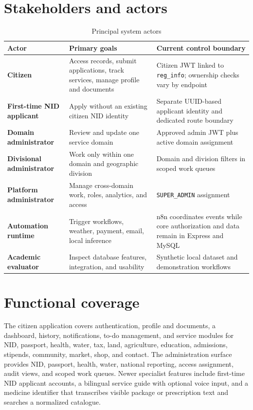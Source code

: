 \documentclass[12pt,a4paper,oneside]{report}
\newcommand{\code}[1]{\texttt{#1}}
\begin{document}
\section{Stakeholders and actors}

\begin{table}[htbp]
\centering
\caption{Principal system actors}
\begin{tabularx}{\textwidth}{>{\bfseries}p{} X X}
\toprule
Actor & Primary goals & Current control boundary\\
\midrule
Citizen & Access records, submit applications, track services, manage profile and documents & Citizen JWT linked to \code{reg\_info}; ownership checks vary by endpoint\\
First-time NID applicant & Apply without an existing citizen NID identity & Separate UUID-based applicant identity and dedicated route boundary\\
Domain administrator & Review and update one service domain & Approved admin JWT plus active domain assignment\\
Divisional administrator & Work only within one domain and geographic division & Domain and division filters in scoped work queues\\
Platform administrator & Manage cross-domain work, roles, analytics, and access & \code{SUPER\_ADMIN} assignment\\
Automation runtime & Trigger workflows, weather, payment, email, local inference & n8n coordinates events while core authorization and data remain in Express and MySQL\\
Academic evaluator & Inspect database features, integration, and usability & Synthetic local dataset and demonstration workflows\\
\bottomrule
\end{tabularx}
\end{table}

\section{Functional coverage}

The citizen application covers authentication, profile and documents, a dashboard, history,
notifications, to-do management, and service modules for NID, passport, health, water, tax, land,
agriculture, education, admissions, stipends, community, market, shop, and contact. The
administration surface provides NID, passport, health, water, national reporting, access
assignment, audit views, and scoped work queues. Newer specialist features include first-time NID
applicant accounts, a bilingual service guide with optional voice input, and a medicine identifier
that transcribes visible package or prescription text and searches a normalized catalogue.
\end{document}
